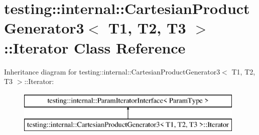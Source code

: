 \hypertarget{classtesting_1_1internal_1_1_cartesian_product_generator3_1_1_iterator}{}\section{testing\+:\+:internal\+:\+:Cartesian\+Product\+Generator3$<$ T1, T2, T3 $>$\+:\+:Iterator Class Reference}
\label{classtesting_1_1internal_1_1_cartesian_product_generator3_1_1_iterator}
Inheritance diagram for testing\+:\+:internal\+:\+:Cartesian\+Product\+Generator3$<$ T1, T2, T3 $>$\+:\+:Iterator\+:\begin{figure}[H]
\begin{center}
\leavevmode
\includegraphics[height=2.000000cm]{classtesting_1_1internal_1_1_cartesian_product_generator3_1_1_iterator}
\end{center}
\end{figure}
